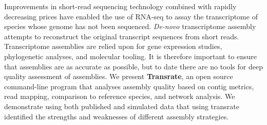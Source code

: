 Improvements in short-read sequencing technology combined with rapidly decreasing prices have enabled the use of RNA-seq to assay the transcriptome of species whose genome has not been sequenced. {\it De-novo} transcriptome assembly attempts to reconstruct the original transcript sequences from short reads. Transcriptome assemblies are relied upon for gene expression studies, phylogenetic analyses, and molecular tooling. It is therefore important to ensure that assemblies are as accurate as possible, but to date there are no tools for deep quality assessment of assemblies. We present \textbf{Transrate}, an open source command-line program that analyses assembly quality based on contig metrics, read mapping, comparison to reference species, and network analysis. We demonstrate using both published and simulated data that using transrate identified the strengths and weaknesses of different assembly strategies.